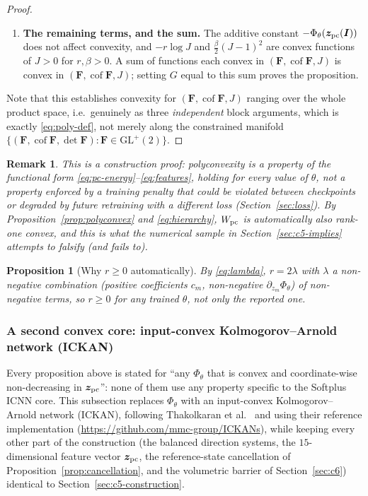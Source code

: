 \documentclass[10pt,a4paper]{article}
\newtheorem{proposition}{Proposition}
\newtheorem{remark}{Remark}
\newcommand{\Cof}{\operatorname{cof}}
\newcommand{\GLp}{\mathrm{GL}^+(2)}
\begin{document}
\begin{proof}
\begin{enumerate}
\item \textbf{The remaining terms, and the sum.} The additive constant
$-\Phi_\theta(\bm z_{\rm pc}(\bm I))$ does not affect convexity, and
$-r\log J$ and $\tfrac\beta2(J-1)^2$ are convex functions of $J>0$ for
$r,\beta>0$. A sum of functions each convex in $(\bm F,\Cof \bm F,J)$ is
convex in $(\bm F,\Cof \bm F,J)$; setting $G$ equal to this sum proves the
proposition.
\end{enumerate}
Note that this establishes convexity for $(\bm F,\Cof \bm F,J)$ ranging over
the whole product space, i.e.\ genuinely as three \emph{independent}
block arguments, which is exactly \eqref{eq:poly-def}, not merely along
the constrained manifold $\{(\bm F,\Cof \bm F,\det \bm F):\bm F\in\GLp\}$.
\end{proof}

\begin{remark}
This is a construction proof: polyconvexity is a property of the
functional form \eqref{eq:pc-energy}--\eqref{eq:features}, holding for
\emph{every} value of $\theta$, not a property enforced by a training
penalty that could be violated between checkpoints or degraded by future
retraining with a different loss (Section~\ref{sec:loss}). By
Proposition~\ref{prop:polyconvex} and \eqref{eq:hierarchy}, $W_{\rm pc}$
is automatically also rank-one convex, and this is what the numerical
sample in Section~\ref{sec:c5-implies} attempts to falsify (and fails
to).
\end{remark}

\begin{proposition}[Why $r\geq0$ automatically]
By \eqref{eq:lambda}, $r=2\lambda$ with $\lambda$ a non-negative
combination (positive coefficients $c_m$, non-negative $\partial_{z_m}
\Phi_\theta$) of non-negative terms, so $r\geq0$ for \emph{any} trained
$\theta$, not only the reported one.
\end{proposition}

\subsubsection{A second convex core: input-convex Kolmogorov--Arnold network (ICKAN)}
\label{sec:ickan-construction}
Every proposition above is stated for ``any $\Phi_\theta$ that is convex
and coordinate-wise non-decreasing in $\bm z_{\rm pc}$'': none of them
use any property specific to the Softplus ICNN core. This subsection
replaces $\Phi_\theta$ with an input-convex Kolmogorov--Arnold network
(ICKAN), following Thakolkaran et al.~\cite{Thakolkaran2025} and using
their reference implementation
(\url{https://github.com/mmc-group/ICKANs}), while keeping every other
part of the construction (the balanced direction systems, the
$15$-dimensional feature vector $\bm z_{\rm pc}$, the reference-state
cancellation of Proposition~\ref{prop:cancellation}, and the volumetric
barrier of Section~\ref{sec:c6}) identical to
Section~\ref{sec:c5-construction}.
\end{document}
